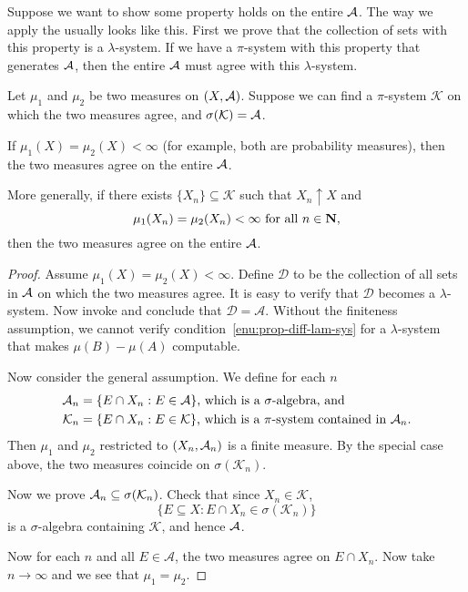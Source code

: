 Suppose we want to show some property holds on the entire $\mathcal{A}$. The way we apply the  usually looks like this. First we prove that the collection of sets with this property is a $\lambda$-system. If we have a $\pi$-system with this property that generates $\mathcal{A}$, then the entire $\mathcal{A}$ must agree with this $\lambda$-system.

\begin{namedthm}
    Let $\mu_1$ and $\mu_2$ be two measures on $(X,\mathcal{A})$. Suppose we can find a $\pi$-system $\mathcal{K}$ on which the two measures agree, and $\sigma(\mathcal{K}) = \mathcal{A}$.

    If $\mu_1(X) = \mu_2(X) < \infty$ (for example, both are probability measures), then the two measures agree on the entire $\mathcal{A}$.

    More generally, if there exists $\{X_n\} \subseteq \mathcal{K}$ such that $X_n \uparrow X$ and \[
        \mu_1(X_n) = \mu_2(X_n) <\infty \text{ for all }n\in \mathbf{N},
    \] then the two measures agree on the entire $\mathcal{A}$.
\end{namedthm}
\begin{proof}
    Assume $\mu_1(X) = \mu_2(X) < \infty$. Define $\mathcal{D}$ to be the collection of all sets in $\mathcal{A}$ on which the two measures agree. It is easy to verify that $\mathcal{D}$ becomes a $\lambda$-system. Now invoke  and conclude that $\mathcal{D} = \mathcal{A}$. Without the finiteness assumption, we cannot verify condition~\ref{enu:prop-diff-lam-sys} for a $\lambda$-system  that makes $\mu(B) - \mu(A)$ computable.

    Now consider the general assumption. We define for each $n$ \begin{align*}
        \mathcal{A}_n & = \{E \cap X_n : E \in \mathcal{A}\}\text{, which is a $\sigma$-algebra, and} \\
        \mathcal{K}_n & = \{E \cap X_n : E \in \mathcal{K}\}\text{, which is a $\pi$-system contained in $\mathcal{A}_n$.}
    \end{align*}
    Then $\mu_1$ and $\mu_2$ restricted to $(X_n,\mathcal{A}_n)$ is a finite measure. By the special case above, the two measures coincide on $\sigma(\mathcal{K}_n)$.

    Now we prove $\mathcal{A}_n \subseteq \sigma(\mathcal{K}_n)$. Check that since $X_n \in \mathcal{K}$, \[
        \{E \subseteq X : E \cap X_n \in \sigma(\mathcal{K}_n)\}
    \] is a $\sigma$-algebra containing $\mathcal{K}$, and hence $\mathcal{A}$.

    Now for each $n$ and all $E \in \mathcal{A}$, the two measures agree on $E \cap X_n$. Now take $n \to \infty$ and we see that $\mu_1 = \mu_2$.
\end{proof}

